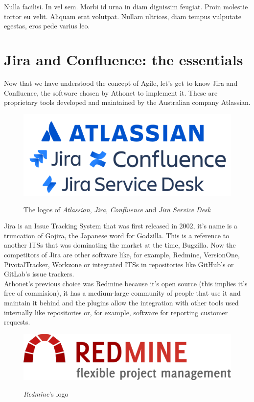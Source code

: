 \begin{savequote}[75mm]
Nulla facilisi. In vel sem. Morbi id urna in diam dignissim feugiat. Proin molestie tortor eu velit. Aliquam erat volutpat. Nullam ultrices, diam tempus vulputate egestas, eros pede varius leo.
\end{savequote}

\chapter{Jira and Confluence: the essentials}
	
	Now that we have understood the concept of Agile, let's get to know Jira and Confluence, the software chosen by Athonet to implement it.
	These are proprietary tools developed and maintained by the Australian company Atlassian.
	\begin{figure}[H]
		\centering
		\includegraphics[width=.7\textwidth]{resources/atlassian_logo}\\
		\caption{The logos of \textit{Atlassian}, \textit{Jira}, \textit{Confluence} and \textit{Jira Service Desk}}
	\end{figure}
	Jira is an Issue Tracking System that was first released in 2002, it's name is a truncation of Gojira, the Japanese word for Godzilla.
	This is a reference to another ITSs that was dominating the market at the time, Bugzilla.
	Now the competitors of Jira are other software like, for example, Redmine, VersionOne, PivotalTracker, Workzone or integrated ITSs in repositories like GitHub's or GitLab's issue trackers.\\
	Athonet's previous choice was Redmine because it's open source (this implies it's free of commision), it has a medium-large community of people that use it and maintain it behind and the plugins allow the integration with other tools used internally like repositories or, for example, software for reporting customer requests.
	\begin{figure}[H]
		\centering
		\includegraphics[width=.6\textwidth]{resources/redmine_logo}\\
		\caption{\textit{Redmine}'s logo}
	\end{figure}
